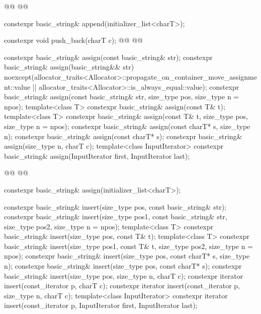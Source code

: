 \documentclass{wg21}
\begin{document}
\begin{codeblock}
{{        @@
        @@

        constexpr basic_string& append(initializer_list<charT>);

        constexpr void push_back(charT c);
        @@
        @@

        constexpr basic_string& assign(const basic_string& str);
        constexpr basic_string& assign(basic_string&& str)
        noexcept(allocator_traits<Allocator>::propagate_on_container_move_assignment::value ||
        allocator_traits<Allocator>::is_always_equal::value);
        constexpr basic_string& assign(const basic_string& str, size_type pos, size_type n = npos);
        template<class T>
        constexpr basic_string& assign(const T& t);
        template<class T>
        constexpr basic_string& assign(const T& t, size_type pos, size_type n = npos);
        constexpr basic_string& assign(const charT* s, size_type n);
        constexpr basic_string& assign(const charT* s);
        constexpr basic_string& assign(size_type n, charT c);
        template<class InputIterator>
        constexpr basic_string& assign(InputIterator first, InputIterator last);

        @@
        @@

        constexpr basic_string& assign(initializer_list<charT>);

        constexpr basic_string& insert(size_type pos, const basic_string& str);
        constexpr basic_string& insert(size_type pos1, const basic_string& str,
        size_type pos2, size_type n = npos);
        template<class T>
        constexpr basic_string& insert(size_type pos, const T& t);
        template<class T>
        constexpr basic_string& insert(size_type pos1, const T& t,
        size_type pos2, size_type n = npos);
        constexpr basic_string& insert(size_type pos, const charT* s, size_type n);
        constexpr basic_string& insert(size_type pos, const charT* s);
        constexpr basic_string& insert(size_type pos, size_type n, charT c);
        constexpr iterator insert(const_iterator p, charT c);
        constexpr iterator insert(const_iterator p, size_type n, charT c);
        template<class InputIterator>
        constexpr iterator insert(const_iterator p, InputIterator first, InputIterator last);

}}
\end{codeblock}
\end{document}
